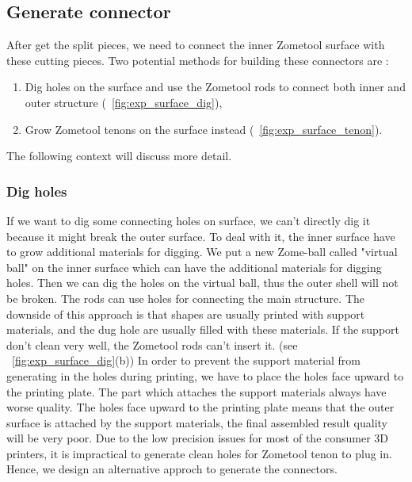 \subsection{Generate connector}
After get the split pieces, we need to connect the inner Zometool surface with these cutting pieces.
Two potential methods for building these connectors are :
\begin{enumerate}
\item Dig holes on the surface and use the Zometool rods to connect both inner and outer structure (\figname~\ref{fig:exp_surface_dig}),  
\item  Grow Zometool tenons on the surface instead (\figname~\ref{fig:exp_surface_tenon}).
\end{enumerate}
The following context will discuss more detail.
\subsubsection{Dig holes}
If we want to dig some connecting holes on surface, we can't directly dig it because it might break the outer surface.
To deal with it, the inner surface have to grow additional materials for digging. We put a new Zome-ball called "virtual ball" on the inner surface which can have the additional materials for digging holes. Then we can dig the holes on the virtual ball, thus the outer shell will not be broken. The rods can use holes for connecting the main structure. The downside of this approach is that shapes are usually printed with support materials, and the dug hole are usually filled with these materials. If the support don't clean very well, the Zometool rods can't insert it. (see \figname~\ref{fig:exp_surface_dig}(b)) In order to prevent the support material from generating in the holes during printing, we have to place the holes face upward to the printing plate. The part which attaches the support materials always have worse quality. The holes face upward to the printing plate means that the outer surface is attached by the support materials, the final assembled result quality will be very poor.
Due to the low precision issues for most of the consumer 3D printers, it is impractical to generate clean holes for Zometool tenon to plug in.
Hence, we design an alternative approch to generate the connectors.
    
